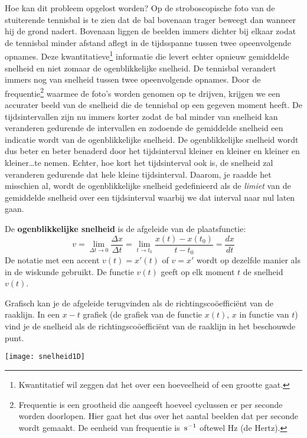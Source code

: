 \documentclass{ximera}
\begin{document}
Hoe kan dit probleem opgelost worden? Op de stroboscopische foto van de stuiterende tennisbal is te zien dat de bal bovenaan trager beweegt dan wanneer hij de grond nadert. Bovenaan liggen de beelden immers dichter bij elkaar zodat de tennisbal minder afstand aflegt in de tijdsspanne tussen twee opeenvolgende opnames. 
Deze kwantitatieve\footnote{Kwantitatief wil zeggen dat het over een hoeveelheid of een grootte gaat.} informatie die levert echter opnieuw gemiddelde snelheid en niet zomaar de ogenblikkelijke snelheid. De tennisbal verandert immers nog van snelheid tussen twee opeenvolgende opnames. Door de frequentie\footnote{Frequentie is een grootheid die aangeeft hoeveel cyclussen er per seconde worden doorlopen. Hier gaat het dus over het aantal beelden dat per seconde wordt gemaakt. De eenheid van frequentie is $\rm\,s^{-1}$ oftewel Hz (de Hertz).} waarmee de foto's worden genomen op te drijven, krijgen we een accurater beeld van de snelheid die de tennisbal op een gegeven moment heeft. De tijdsintervallen zijn nu immers korter zodat de bal minder van snelheid kan veranderen gedurende de intervallen en zodoende de gemiddelde snelheid een indicatie wordt van de ogenblikkelijke snelheid. De ogenblikkelijke snelheid wordt dus beter en beter benaderd door het tijdsinterval kleiner en kleiner en kleiner en kleiner\ldots te nemen. Echter, hoe kort het tijdsinterval ook is, de snelheid zal veranderen gedurende dat hele kleine tijdsinterval. Daarom, je raadde het misschien al, wordt de ogenblikkelijke snelheid gedefinieerd als de \emph{limiet} van de gemiddelde snelheid over een tijdsinterval waarbij we dat interval naar nul laten gaan. 

\begin{definition}
	
De \textbf{ogenblikkelijke snelheid}  is de afgeleide van de plaatsfunctie:
\[
v=\lim_{\Delta t\to 0}\frac{\Delta x}{\Delta t}=\lim_{t\to t_0}\frac{x(t)-x(t_0)}{t-t_0}=\frac{dx}{dt}
\]
De notatie met een accent $v(t)=x'(t)$ of $v=x'$ wordt op dezelfde manier als in de wiskunde gebruikt. 
De functie $v(t)$ geeft op elk moment $t$ de snelheid $v(t)$. 
\end{definition}


Grafisch kan je de afgeleide terugvinden als de richtingscoöefficiënt van de raaklijn. In een $x-t$ grafiek (de grafiek van de functie $x(t)$, $x$ in functie van $t$) vind je  de snelheid als de richtingscoöefficiënt van de raaklijn in het beschouwde punt. 

\begin{image}
\texttt{[image: snelheid1D]}

\end{image}
\end{document}
